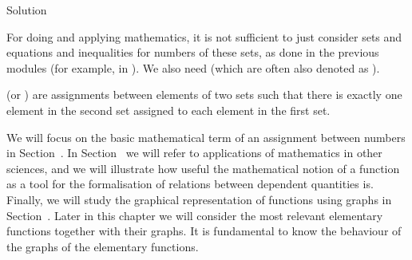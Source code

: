\begin{MIntro}
\begin{MExercise}
\begin{MHint}{Solution}
\MTikzAuto{%
\begin{tikzpicture}
\draw[->,color=black] (5,0.0) -- (11,0.0);
\foreach \x in {6, 7, 8, 9, 10}
\draw[shift={(\x,0)},color=black] (0pt,2pt) -- (0pt,-2pt) node[below] {\footnotesize $\x$};
\draw (10.7,-0.3) node[] {$\mathbb{R}$};
\draw [line width=2.0pt,color=blue] (8,0.0)-- (8.5,0.0);
\draw [color = blue, fill = white] (8,0) circle (1.5pt);
\draw [fill = blue] (8.5,0) circle (1.5pt);
\end{tikzpicture}
}%

\end{MHint}
\end{MExercise}

For doing and applying mathematics, it is not sufficient to just consider sets and 
equations and inequalities for numbers of these sets, as done in the previous modules (for example, 
in ). We also need  
(which are often also denoted as ).

\begin{MInfo}
 (or ) are assignments between elements of two sets such that there is exactly one element in the second set assigned to each element in the first set.%
\end{MInfo}
\end{MIntro}

We will focus on the basic mathematical term of an assignment between numbers in 
Section~. In Section~ we will refer to  
applications of mathematics in other sciences, and we will illustrate how useful the 
mathematical notion of a function as a tool for the formalisation of relations between 
dependent quantities is. Finally, we will study the graphical representation of functions 
using graphs in Section~. Later in this chapter we will consider 
the most relevant elementary functions together with their graphs. It is fundamental to 
know the behaviour of the graphs of the elementary functions.


